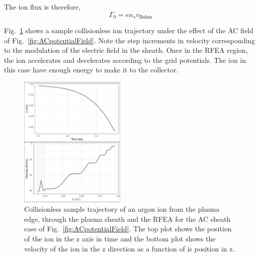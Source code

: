 The ion flux is therefore, 
\begin{equation}
\Gamma_0 = e n_s v_\text{Bohm} 
\end{equation}

Fig.~\ref{fig:CollisionlessACtrajectory} shows a sample collisionless ion trajectory under the effect of the AC field of Fig.~\ref{fig:ACpotentialField}. Note the step increments in velocity corresponding to the modulation of the electric field in the sheath. Once in the RFEA region, the ion accelerates and decelerates according to the grid potentials. The ion in this case have enough energy to make it to the collector. 

\begin{figure}[htbp]
\centering
\includegraphics[width=0.45\textwidth]{Figures/ionTrajectory0.5Pa13.56MHz2kVStack2332_Collisionless.jpeg}
\caption{Collisionless sample trajectory of an argon ion from the plasma edge, through the plasma sheath and the RFEA for the AC sheath case of Fig.~\ref{fig:ACpotentialField}. The top plot shows the position of the ion in the z axis in time and the bottom plot shows the velocity of the ion in the z direction as a function of is position in z. }
\label{fig:CollisionlessACtrajectory}
\end{figure}



